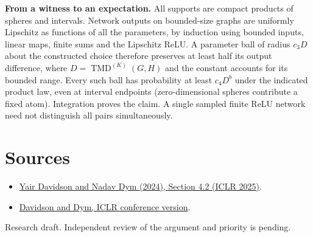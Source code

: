 \documentclass[10pt]{article}
\begin{document}
\textbf{From a witness to an expectation.} All supports are compact products of spheres and intervals. Network outputs on bounded-size graphs are uniformly Lipschitz as functions of all the parameters, by induction using bounded inputs, linear maps, finite sums and the Lipschitz ReLU. A parameter ball of radius $c_3 D$ about the constructed choice therefore preserves at least half its output difference, where $D=\operatorname{TMD}^{(K)}(G,H)$ and the constant accounts for its bounded range. Every such ball has probability at least $c_4 D^b$ under the indicated product law, even at interval endpoints (zero-dimensional spheres contribute a fixed atom). Integration proves the claim. A single sampled finite ReLU network need not distinguish all pairs simultaneously.

\section*{Sources}
\begin{itemize}
\item \href{https://arxiv.org/abs/2406.06984}{Yair Davidson and Nadav Dym (2024), Section 4.2 (ICLR 2025)}.
\item \href{https://proceedings.iclr.cc/paper_files/paper/2025/hash/89d0d5c2f720921df93bbb8fef514571-Abstract-Conference.html}{Davidson and Dym, ICLR conference version}.
\end{itemize}
{\small Research draft. Independent review of the argument and priority is pending.}
\end{document}
